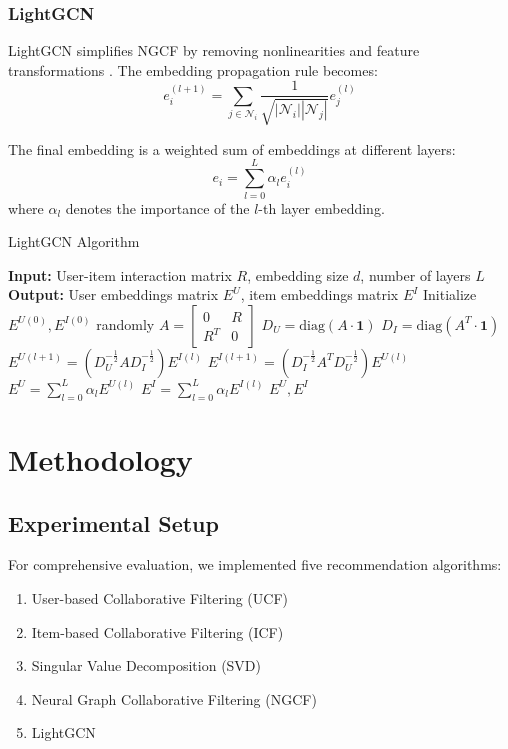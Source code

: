 \documentclass[sigconf,nonacm]{acmart} %
\begin{document}
\subsubsection{LightGCN}
LightGCN simplifies NGCF by removing nonlinearities and feature transformations \cite{he2020lightgcn}. The embedding propagation rule becomes:
\begin{equation}
e_i^{(l+1)} = \sum_{j\in\mathcal{N}_i} \frac{1}{\sqrt{|\mathcal{N}_i||\mathcal{N}_j|}}e_j^{(l)}
\label{eq:lightgcn}
\end{equation}

The final embedding is a weighted sum of embeddings at different layers:
\begin{equation}
e_i = \sum_{l=0}^{L} \alpha_l e_i^{(l)}
\label{eq:lightgcn_final}
\end{equation}
where $\alpha_l$ denotes the importance of the $l$-th layer embedding.

\begin{algorithm}[ht]
\caption{LightGCN Algorithm}
\label{alg:lightgcn}
\begin{algorithmic}
\STATE \textbf{Input:} User-item interaction matrix $R$, embedding size $d$, number of layers $L$
\STATE \textbf{Output:} User embeddings matrix $E^U$, item embeddings matrix $E^I$
\STATE Initialize $E^{U(0)}, E^{I(0)}$ randomly
\STATE $A = \begin{bmatrix} 0 & R \\ R^T & 0 \end{bmatrix}$ \quad
\STATE $D_U = \text{diag}(A \cdot \mathbf{1})$ \quad 
\STATE $D_I = \text{diag}(A^T \cdot \mathbf{1})$ \quad  
{}
    \STATE $E^{U(l+1)} = (D_U^{-\frac{1}{2}}AD_I^{-\frac{1}{2}})E^{I(l)}$
    \STATE $E^{I(l+1)} = (D_I^{-\frac{1}{2}}A^TD_U^{-\frac{1}{2}})E^{U(l)}$
\ENDFOR
\STATE $E^U = \sum_{l=0}^{L}\alpha_l E^{U(l)}$
\STATE $E^I = \sum_{l=0}^{L}\alpha_l E^{I(l)}$
\RETURN $E^U, E^I$


\end{algorithmic}
\end{algorithm}

  
\section{Methodology}  
\subsection{Experimental Setup}  
For comprehensive evaluation, we implemented five recommendation algorithms:  
\begin{enumerate}  
    \item User-based Collaborative Filtering (UCF)  
    \item Item-based Collaborative Filtering (ICF)  
    \item Singular Value Decomposition (SVD)  
    \item Neural Graph Collaborative Filtering (NGCF)  
    \item LightGCN  
\end{enumerate}  
\end{document}
